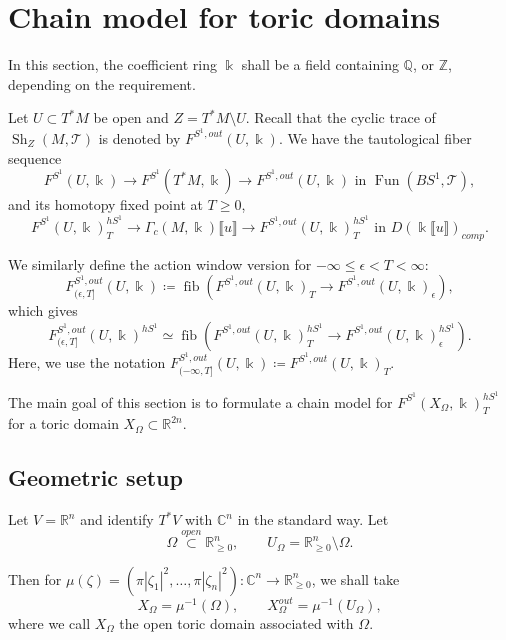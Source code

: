 \documentclass[11pt]{amsart}
\numberwithin{equation}{section}
\theoremstyle{plain}
\theoremstyle{definition}
\theoremstyle{remark}
\newcommand{\bC} { {\mathbb{C}}}
\newcommand{\bQ} { {\mathbb{Q}}}
\newcommand{\bZ} { {\mathbb{Z}}}
\newcommand{\bR} { {\mathbb{R}}}
\newcommand{\sT} { {\mathscr{T}}}
\newcommand{\fpw}[1]{{\llbracket #1\rrbracket}}
\newcommand{\Sh} { {\operatorname{Sh}}}
\newcommand\Fun{\operatorname{Fun}}
\newcommand\fib{\operatorname{fib}}
\begin{document}
 


 














 



\section{Chain model for toric domains}\label{section: chain model overall}In this section, the coefficient ring $\Bbbk$ shall be a field containing $\bQ$, or $\bZ$, depending on the requirement.

Let $U\subset T^*M$ be open and $Z=T^*M\setminus U$.  Recall that the cyclic trace of $\Sh_{Z}(M,\sT)$ is denoted by $F^{S^1,out}(U,\Bbbk)$. We have the tautological fiber sequence
\[F^{S^1}(U,\Bbbk)\to F^{S^1}(T^*M,\Bbbk)\to F^{S^1,out}(U,\Bbbk)  \text{  in  } \Fun(BS^1,\sT),\]
and its homotopy fixed point at  $T\geq 0$, 
\[F^{S^1}(U,\Bbbk)_T^{hS^1}\to \Gamma_c(M,\Bbbk)\fpw{u} \to F^{S^1,out}(U,\Bbbk)_T^{hS^1} \text{  in  } D(\Bbbk\fpw{u})_{comp}.\]

We similarly define the action window version for $-\infty \leq \epsilon<T<\infty$: 
\[F_{(\epsilon,T]}^{S^1,out}(U,\Bbbk)\coloneqq \fib(F^{S^1,out}(U,\Bbbk)_T\to F^{S^1,out}(U,\Bbbk)_\epsilon),\]
which gives
\[ F_{(\epsilon,T]}^{S^1,out}(U,\Bbbk)^{hS^1}\simeq \fib(F^{S^1,out}(U,\Bbbk)_T^{hS^1}\to F^{S^1,out}(U,\Bbbk)_\epsilon^{hS^1}).\]
Here, we use the notation $F_{(-\infty,T]}^{S^1,out}(U,\Bbbk)\coloneqq F^{S^1,out}(U,\Bbbk)_T$.

The main goal of this section is to formulate a chain model for $F^{S^1}(X_\Omega,\Bbbk)_T^{hS^1} $ for a toric domain $X_\Omega \subset \bR^{2n}$.

\subsection{Geometric setup}

Let $V=\bR^n$ and identify $T^*V$ with $\mathbb C^n$ in the standard way.  Let 
\[\Omega\overset{open}{\subset}\bR_{\geq0}^n,\qquad
  U_\Omega=\bR_{\geq0}^n\setminus\Omega.
\]

Then for $\mu(\zeta)=(\pi|\zeta_1|^2,\dots,\pi|\zeta_n|^2):\bC^n\to \bR_{\geq0}^n$, we shall take 
\[X_\Omega=\mu^{-1}(\Omega),\qquad X_\Omega^{out}=\mu^{-1}(U_\Omega),\]
where we call $X_\Omega$ the open toric domain associated with $\Omega$.
\end{document}
